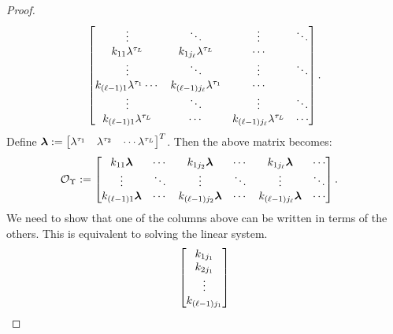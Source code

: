 \begin{proof}
\begin{align*}
\begin{bmatrix}
	\vdots & \ddots &\vdots & \ddots\\
	k_{11}\lambda^{\tau_{L}}  & k_{1j_{\ell}}\lambda^{\tau_{L}} & \cdots\\
	\vdots & \ddots & \vdots & \ddots\\
	k_{(\ell-1)1}\lambda^{\tau_1}  \cdots & k_{(\ell-1)j_{\ell}}\lambda^{\tau_1} & \cdots\\
	\vdots & \ddots &\vdots & \ddots\\
	k_{(\ell-1)1}\lambda^{\tau_{L}}  & \cdots & k_{(\ell-1)j_{\ell}}\lambda^{\tau_{L}} & \cdots
	\end{bmatrix}.
	\end{align*}
	Define $\boldsymbol{\lambda}:= \begin{bmatrix}\lambda^{\tau_1} & \lambda^{\tau_2} & \cdots \lambda^{\tau_{L}}\end{bmatrix}^T$. 
	Then the above matrix becomes:
	\begin{align*}
	\mathcal{O}_{\Upsilon}
	&:= 
	\begin{bmatrix}
	k_{11}\boldsymbol{\lambda}  & \cdots & k_{1j_2}\boldsymbol{\lambda} & \cdots & k_{1j_{\ell}}\boldsymbol{\lambda} & \cdots\\
	\vdots & \ddots & \vdots & \ddots &\vdots & \ddots\\
	k_{(\ell-1)1}\boldsymbol{\lambda}  & \cdots & k_{(\ell-1)j_2}\boldsymbol{\lambda} & \cdots & k_{(\ell-1)j_{\ell}}\boldsymbol{\lambda} & \cdots
	\end{bmatrix}.
	\end{align*}
	We need to show that one of the columns above can be written in terms of the others. This is equivalent to solving the linear system.
	\begin{align*}
	\begin{bmatrix}
	\kernel_{1j_1}\\
	\kernel_{2j_1}\\
	\vdots\\
	\kernel_{(\minmeas-1)j_1}
	\end{bmatrix}

\end{align*}
\end{proof}
